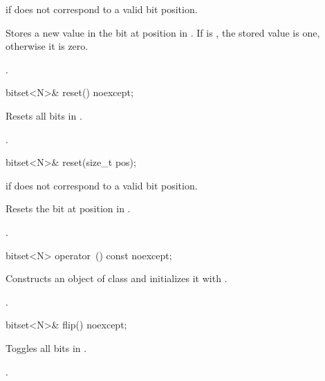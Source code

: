 \begin{itemdescr}
\pnum
\throws
{}
if  does not correspond to a valid bit position.%

\pnum
\effects
Stores a new value in the bit at position  in
.
If  is , the stored value is one, otherwise it is zero.

\pnum
\returns
{}.
\end{itemdescr}

%
\begin{itemdecl}
bitset<N>& reset() noexcept;
\end{itemdecl}

\begin{itemdescr}
\pnum
\effects
Resets all bits in
.

\pnum
\returns
{}.
\end{itemdescr}

%
\begin{itemdecl}
bitset<N>& reset(size_t pos);
\end{itemdecl}

\begin{itemdescr}
\pnum
\throws
{}
if  does not correspond to a valid bit position.
%

\pnum
\effects
Resets the bit at position  in
.

\pnum
\returns
{}.
\end{itemdescr}

%
\begin{itemdecl}
bitset<N> operator~() const noexcept;
\end{itemdecl}

\begin{itemdescr}
\pnum
\effects
Constructs an object  of class
and initializes it with
.

\pnum
\returns
{}.
\end{itemdescr}

%
\begin{itemdecl}
bitset<N>& flip() noexcept;
\end{itemdecl}

\begin{itemdescr}
\pnum
\effects
Toggles all bits in
.

\pnum
\returns
{}.
\end{itemdescr}

